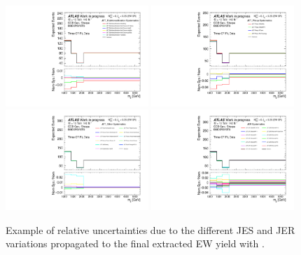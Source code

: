 \begin{figure}[t]
  \includegraphics[width=0.48\textwidth]{plots/diffx/expsysts/groups/mjj_QCD_Sh2211_BSEXPSYSTS_3cr_JET_EtaIntercalibration_0p01sigma_allvariations.pdf}
  \includegraphics[width=0.48\textwidth]{plots/diffx/expsysts/groups/mjj_QCD_Sh2211_BSEXPSYSTS_3cr_JET_Pileup_0p01sigma_allvariations.pdf}
  \includegraphics[width=0.48\textwidth]{plots/diffx/expsysts/groups/mjj_QCD_Sh2211_BSEXPSYSTS_3cr_JET_Other_0p01sigma_allvariations.pdf}
  \includegraphics[width=0.48\textwidth]{plots/diffx/expsysts/groups/mjj_QCD_Sh2211_BSEXPSYSTS_3cr_JER_0p01sigma_allvariations.pdf}
  \caption{Example of relative uncertainties due to the different JES and JER variations propagated to the final extracted EW yield with \mjj.}
  \label{fig:vbswy:jesvariationsmjj}
\end{figure}

